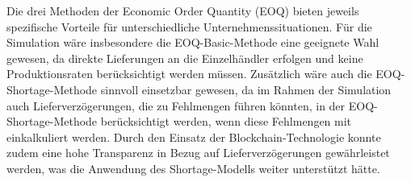 \documentclass[a4paper,12pt]{article}
\begin{document}
Die drei Methoden der Economic Order Quantity (EOQ) bieten jeweils spezifische Vorteile für unterschiedliche Unternehmenssituationen.
Für die Simulation wäre insbesondere die EOQ-Basic-Methode eine geeignete Wahl gewesen, da direkte Lieferungen an die Einzelhändler erfolgen und keine Produktionsraten berücksichtigt werden müssen.
Zusätzlich wäre auch die EOQ-Shortage-Methode sinnvoll einsetzbar gewesen, da im Rahmen der Simulation auch Lieferverzögerungen, die zu Fehlmengen führen könnten, in der EOQ-Shortage-Methode berücksichtigt werden, wenn diese Fehlmengen mit einkalkuliert werden.
Durch den Einsatz der Blockchain-Technologie konnte zudem eine hohe Transparenz in Bezug auf Lieferverzögerungen gewährleistet werden, was die Anwendung des Shortage-Modells weiter unterstützt hätte.


\end{document}
